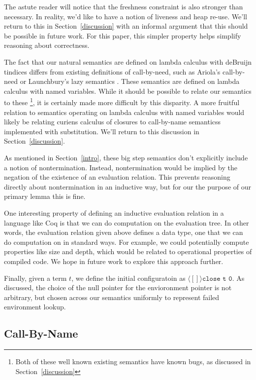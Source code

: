 The astute reader will notice that the freshness constraint is also stronger
than necessary. In reality, we'd like to have a notion of liveness and heap
re-use.  We'll return to this in Section~\ref{discussion} with an informal
argument that this should be possible in future work. For this paper, this
simpler property helps simplify reasoning about correctness.  

The fact that our natural semantics are defined on lambda calculus with deBruijn
tindices differs from existing definitions of call-by-need, such as Ariola's
call-by-need \cite{ariola} or Launchbury's lazy semantics \cite{launchbury}.
These semantics are defined on lambda calculus with named variables. While it
should be possible to relate our semantics to these \footnote{Both of these well
known existing semantics have known bugs, as discussed in
Section~\ref{discussion}}, it is certainly made more difficult by this
disparity. A more fruitful relation to semantics operating on lambda calculus
with named variables would likely be relating curiens calculus of closures to
call-by-name semanticss implemented with substitution. We'll return to this
discussion in Section~\ref{discussion}.

As mentioned in Section~\ref{intro}, these big step semantics don't explicitly
include a notion of nontermination. Instead, nontermination would be implied by
the negation of the existence of an evaluation relation. This prevents reasoning
directly about nontermination in an inductive way, but for our the purpose of
our primary lemma this is fine. 

One interesting property of defining an inductive evaluation relation in a
language like Coq is that we can do computation on the evaluation tree. In other
words, the evaluation relation given above defines a data type, one that we can
do computation on in standard ways. For example, we could potentially compute
properties like size and depth, which would be related to operational properties
of compiled code. We hope in future work to explore this approach further.

Finally, given a term $t$, we define the initial configuratoin as $\langle [] \rangle
\texttt{close t 0}$. As discussed, the choice of the null pointer for the envioronment
pointer is not arbitrary, but chosen across our semantics uniformly to represent
failed environment lookup. 

\subsection{Call-By-Name}

